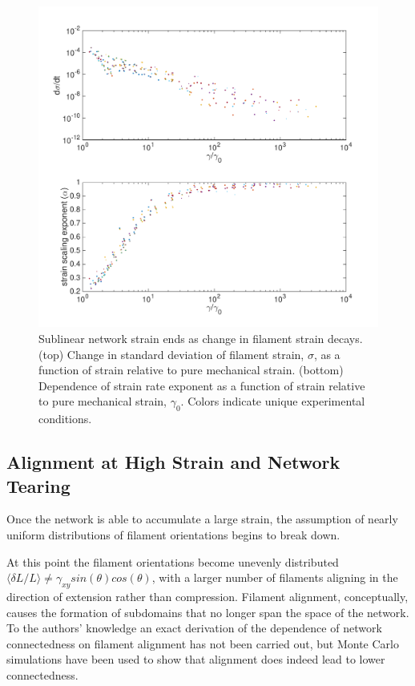\documentclass[pre,preprint]{revtex4-1}
\begin{document}
\begin{figure}[h!]
\centering
\includegraphics[width=\hsize]{collapse}
\caption{\label{fig:strain_coll} Sublinear network strain ends as change in filament strain decays. (top) Change in standard deviation of filament strain, $\sigma$, as a function of strain relative to pure mechanical strain. (bottom)   Dependence of strain rate exponent as a function of strain relative to pure mechanical strain, $\gamma_0$.  Colors indicate unique experimental conditions. }
\end{figure}




















\subsection{Alignment at High Strain and Network Tearing}

Once the network is able to accumulate a large strain, the assumption of nearly uniform distributions of filament orientations begins to break down.

At this point the filament orientations become unevenly distributed $\langle \delta L / L \rangle \neq \gamma_{xy}sin(\theta)cos(\theta)$, with a larger number of filaments aligning in the direction of extension rather than compression.  Filament alignment, conceptually, causes the formation of subdomains that no longer span the space of the network. To the authors' knowledge an exact derivation of the dependence of network connectedness on filament alignment has not been carried out, but Monte Carlo simulations have been used to show that alignment does indeed lead to lower connectedness\cite{model_percolationanisotropy}.
\end{document}
